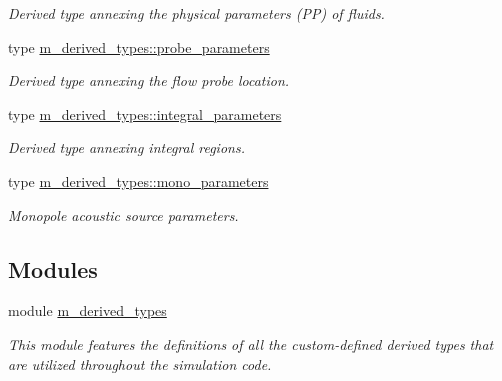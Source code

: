 \begin{DoxyCompactItemize}
\begin{DoxyCompactList}\small\item\em Derived type annexing the physical parameters (PP) of fluids. \end{DoxyCompactList}\item 
type \hyperlink{structm__derived__types_1_1probe__parameters}{m\+\_\+derived\+\_\+types\+::probe\+\_\+parameters}
\begin{DoxyCompactList}\small\item\em Derived type annexing the flow probe location. \end{DoxyCompactList}\item 
type \hyperlink{structm__derived__types_1_1integral__parameters}{m\+\_\+derived\+\_\+types\+::integral\+\_\+parameters}
\begin{DoxyCompactList}\small\item\em Derived type annexing integral regions. \end{DoxyCompactList}\item 
type \hyperlink{structm__derived__types_1_1mono__parameters}{m\+\_\+derived\+\_\+types\+::mono\+\_\+parameters}
\begin{DoxyCompactList}\small\item\em Monopole acoustic source parameters. \end{DoxyCompactList}\end{DoxyCompactItemize}
\subsection*{Modules}
\begin{DoxyCompactItemize}
\item 
module \hyperlink{namespacem__derived__types}{m\+\_\+derived\+\_\+types}
\begin{DoxyCompactList}\small\item\em This module features the definitions of all the custom-\/defined derived types that are utilized throughout the simulation code. \end{DoxyCompactList}\end{DoxyCompactItemize}

